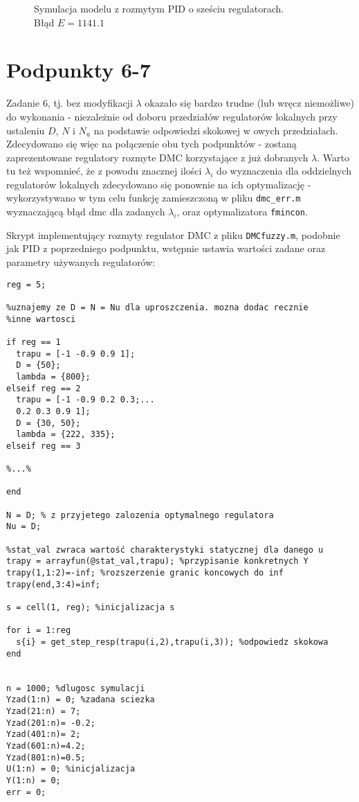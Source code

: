 \begin{figure}[ht]
\centering

\caption{Symulacja modelu z rozmytym PID o sześciu regulatorach. \\
Błąd $ E=\num{1141,1} $}
\label{Z5e}
\end{figure}


\chapter{Podpunkty 6-7}
Zadanie 6, tj. bez modyfikacji $ \lambda $ okazało się bardzo trudne (lub wręcz niemożliwe) do wykonania - niezależnie od doboru przedziałów regulatorów lokalnych przy ustaleniu $ D $, $ N $ i $ N_\mathrm{u} $ na podstawie odpowiedzi skokowej w owych przedziałach. Zdecydowano się więc na połączenie obu tych podpunktów - zostaną zaprezentowane regulatory rozmyte DMC korzystające z już dobranych $ \lambda $. Warto tu też wspomnieć, że z powodu znacznej ilości $ \lambda_i $ do wyznaczenia dla oddzielnych regulatorów lokalnych zdecydowano się ponownie na ich optymalizację - wykorzystywano w tym celu funkcję zamieszczoną w pliku \verb|dmc_err.m| wyznaczającą błąd dmc dla zadanych $ \lambda_i $, oraz optymalizatora \verb|fmincon|.

Skrypt implementujący rozmyty regulator DMC z pliku \verb|DMCfuzzy.m|, podobnie jak PID z poprzedniego podpunktu, wstępnie ustawia wartości zadane oraz parametry używanych regulatorów:

\begin{lstlisting}[style=Matlab-editor]
reg = 5;

%uznajemy ze D = N = Nu dla uproszczenia. mozna dodac recznie
%inne wartosci

if reg == 1
  trapu = [-1 -0.9 0.9 1];
  D = {50};
  lambda = {800}; 
elseif reg == 2
  trapu = [-1 -0.9 0.2 0.3;...
  0.2 0.3 0.9 1];
  D = {30, 50};
  lambda = {222, 335};
elseif reg == 3

%...%

end

N = D; % z przyjetego zalozenia optymalnego regulatora
Nu = D;

%stat_val zwraca wartość charakterystyki statycznej dla danego u
trapy = arrayfun(@stat_val,trapu); %przypisanie konkretnych Y
trapy(1,1:2)=-inf; %rozszerzenie granic koncowych do inf
trapy(end,3:4)=inf;

s = cell(1, reg); %inicjalizacja s

for i = 1:reg
  s{i} = get_step_resp(trapu(i,2),trapu(i,3)); %odpowiedz skokowa
end                                              


n = 1000; %dlugosc symulacji
Yzad(1:n) = 0; %zadana sciezka
Yzad(21:n) = 7;
Yzad(201:n)= -0.2;  
Yzad(401:n)= 2; 
Yzad(601:n)=4.2; 
Yzad(801:n)=0.5;
U(1:n) = 0; %inicjalizacja
Y(1:n) = 0;
err = 0;

\end{lstlisting}

